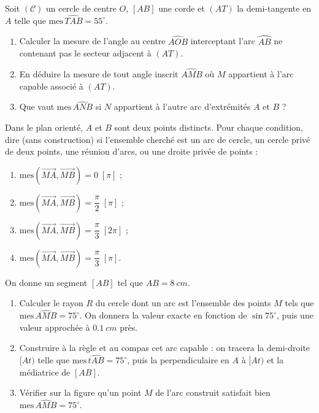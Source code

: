 \documentclass[11pt]{article}
\newcounter{popsec}
\newcounter{popsub}
\newcommand{\courssub}[1]{%
  \stepcounter{popsub}%
  \par\vspace{9pt}\noindent{\popxbold\fontsize{11.5}{13}\selectfont\color{popink}{\color{poporange}\thepopsec.\thepopsub}\hspace{6pt}#1}\par\nopagebreak\vspace{4pt}
}
\begin{document}
\begin{exercice}
Soit $(\mathcal{C})$ un cercle de centre $O$, $[AB]$ une corde et $(AT)$ la demi-tangente en $A$ telle que $\mathrm{mes}\,\widehat{TAB} = 55^{\circ}$.
\begin{enumerate}
\item Calculer la mesure de l'angle au centre $\widehat{AOB}$ interceptant l'arc $\wideparen{AB}$ ne contenant pas le secteur adjacent à $(AT)$.
\item En déduire la mesure de tout angle inscrit $\widehat{AMB}$ où $M$ appartient à l'arc capable associé à $(AT)$.
\item Que vaut $\mathrm{mes}\,\widehat{ANB}$ si $N$ appartient à l'autre arc d'extrémités $A$ et $B$ ?
\end{enumerate}
\end{exercice}

\begin{exercice}
Dans le plan orienté, $A$ et $B$ sont deux points distincts. Pour chaque condition, dire (sans construction) si l'ensemble cherché est un arc de cercle, un cercle privé de deux points, une réunion d'arcs, ou une droite privée de points :
\begin{enumerate}
\item $\mathrm{mes}(\overrightarrow{MA}, \overrightarrow{MB}) = 0 \; [\pi]$ ;
\item $\mathrm{mes}(\overrightarrow{MA}, \overrightarrow{MB}) = \dfrac{\pi}{2} \; [\pi]$ ;
\item $\mathrm{mes}(\overrightarrow{MA}, \overrightarrow{MB}) = \dfrac{\pi}{3} \; [2\pi]$ ;
\item $\mathrm{mes}(\overrightarrow{MA}, \overrightarrow{MB}) = \dfrac{\pi}{3} \; [\pi]$.
\end{enumerate}
\end{exercice}

\courssub{Je m'entraîne}

\begin{exercice}
On donne un segment $[AB]$ tel que $AB = \SI{8}{cm}$.
\begin{enumerate}
\item Calculer le rayon $R$ du cercle dont un arc est l'ensemble des points $M$ tels que $\mathrm{mes}\,\widehat{AMB} = 75^{\circ}$. On donnera la valeur exacte en fonction de $\sin 75^{\circ}$, puis une valeur approchée à $\SI{0,1}{cm}$ près.
\item Construire à la règle et au compas cet arc capable : on tracera la demi-droite $[At)$ telle que $\mathrm{mes}\,\widehat{tAB} = 75^{\circ}$, puis la perpendiculaire en $A$ à $[At)$ et la médiatrice de $[AB]$.
\item Vérifier sur la figure qu'un point $M$ de l'arc construit satisfait bien $\mathrm{mes}\,\widehat{AMB} = 75^{\circ}$.
\end{enumerate}
\end{exercice}
\end{document}
